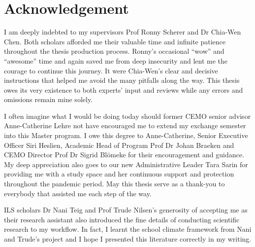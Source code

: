 \documentclass[a4paper,11pt,UKenglish,twoside,openright]{report}\usepackage[]{graphicx}\usepackage[]{color}
\begin{document}

\setcounter{page}{0}

\tableofcontents

\listoftables
\setcounter{page}{3}

\listoffigures
\setcounter{page}{4}



\doublespacing


\chapter*{Acknowledgement}
\label{Ac}

I am deeply indebted to my supervisors Prof Ronny Scherer and Dr Chia-Wen Chen. Both scholars afforded me their valuable time and infinite patience throughout the thesis production process. Ronny's occasional ``wow'' and ``awesome'' time and again saved me from deep insecurity and lent me the courage to continue this journey. It were Chia-Wen's clear and decisive instructions that helped me avoid the many pitfalls along the way. This thesis owes its very existence to both experts' input and reviews while any errors and omissions remain mine solely.

I often imagine what I would be doing today should former CEMO senior advisor Anne-Catherine Lehre not have encouraged me to extend my exchange semester into this Master program. I owe this degree to Anne-Catherine, Senior Executive Officer Siri Heslien, Academic Head of Program Prof Dr Johan Braeken and CEMO Director Prof Dr Sigrid Bl{\"o}meke for their encouragement and guidance. My deep appreciation also goes to our new Administrative Leader Tara Sarin for providing me with a study space and her continuous support and protection throughout the pandemic period. May this thesis serve as a thank-you to everybody that assisted me each step of the way.

ILS scholars Dr Nani Teig and Prof Trude Nilsen's generosity of accepting me as their research assistant also introduced the fine details of conducting scientific research to my workflow. In fact, I learnt the school climate framework from Nani and Trude's project and I hope I presented this literature correctly in my writing.
\end{document}
